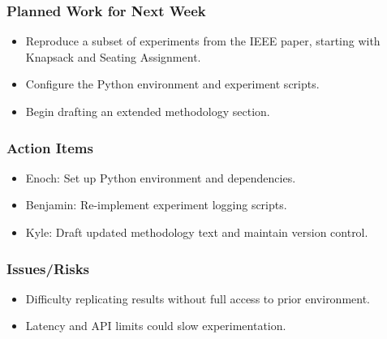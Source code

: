 \subsubsection{Planned Work for Next Week}
\begin{itemize}
  \item Reproduce a subset of experiments from the IEEE paper, starting with Knapsack and Seating Assignment. 
  \item Configure the Python environment and experiment scripts. 
  \item Begin drafting an extended methodology section. 
\end{itemize}

\subsubsection{Action Items}
\begin{itemize}
  \item Enoch: Set up Python environment and dependencies. 
  \item Benjamin: Re-implement experiment logging scripts. 
  \item Kyle: Draft updated methodology text and maintain version control. 
\end{itemize}

\subsubsection{Issues/Risks}
\begin{itemize}
  \item Difficulty replicating results without full access to prior environment. 
  \item Latency and API limits could slow experimentation. 
\end{itemize}


